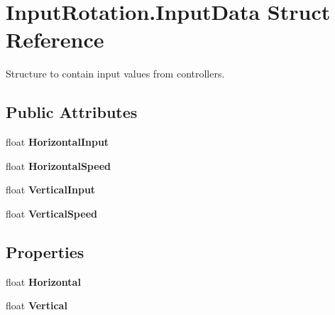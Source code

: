 \hypertarget{struct_input_rotation_1_1_input_data}{\section{Input\-Rotation.\-Input\-Data Struct Reference}
\label{struct_input_rotation_1_1_input_data}
}


Structure to contain input values from controllers.  


\subsection*{Public Attributes}
\begin{DoxyCompactItemize}
\item 
\hypertarget{struct_input_rotation_1_1_input_data_afac094134d3b093474adaa7a2a4e6f28}{float {\bfseries Horizontal\-Input}}\label{struct_input_rotation_1_1_input_data_afac094134d3b093474adaa7a2a4e6f28}

\item 
\hypertarget{struct_input_rotation_1_1_input_data_aef25224476d4fecbc2a197582925300e}{float {\bfseries Horizontal\-Speed}}\label{struct_input_rotation_1_1_input_data_aef25224476d4fecbc2a197582925300e}

\item 
\hypertarget{struct_input_rotation_1_1_input_data_ab57692dda5b500ed08002329d3e67e8b}{float {\bfseries Vertical\-Input}}\label{struct_input_rotation_1_1_input_data_ab57692dda5b500ed08002329d3e67e8b}

\item 
\hypertarget{struct_input_rotation_1_1_input_data_a0a0188d0089d174443a1ce3867e8e590}{float {\bfseries Vertical\-Speed}}\label{struct_input_rotation_1_1_input_data_a0a0188d0089d174443a1ce3867e8e590}

\end{DoxyCompactItemize}
\subsection*{Properties}
\begin{DoxyCompactItemize}
\item 
\hypertarget{struct_input_rotation_1_1_input_data_a1f6ca180234dcbbbaa793f10306af601}{float {\bfseries Horizontal}}\label{struct_input_rotation_1_1_input_data_a1f6ca180234dcbbbaa793f10306af601}

\item 
\hypertarget{struct_input_rotation_1_1_input_data_afd6d97682b68f7c7f9cf2222035af1a6}{float {\bfseries Vertical}}\label{struct_input_rotation_1_1_input_data_afd6d97682b68f7c7f9cf2222035af1a6}

\end{DoxyCompactItemize}


